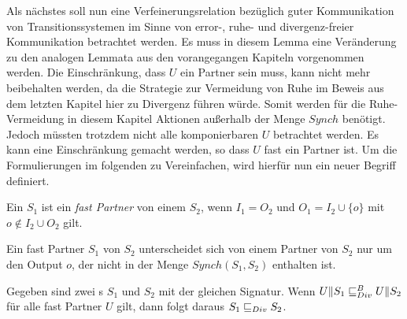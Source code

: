 
Als nächstes soll nun eine Verfeinerungsrelation bezüglich guter Kommunikation
von Transitionssystemen im Sinne von error-, ruhe- und divergenz-freier
Kommunikation betrachtet werden. Es muss in diesem Lemma eine Veränderung zu
den analogen Lemmata aus den vorangegangen Kapiteln vorgenommen werden. Die
Einschränkung, dass $U$ ein Partner sein muss, kann nicht mehr beibehalten
werden, da die Strategie zur Vermeidung von Ruhe im Beweis aus dem letzten
Kapitel hier zu Divergenz führen würde. Somit werden für die Ruhe-Vermeidung in
diesem Kapitel Aktionen außerhalb der Menge $Synch$
benötigt. Jedoch müssten trotzdem nicht alle komponierbaren $U$ betrachtet
werden. Es kann eine Einschränkung gemacht werden, so dass $U$ fast ein
Partner ist. Um die Formulierungen im folgenden zu Vereinfachen, wird hierfür
nun ein neuer Begriff definiert.

\begin{Def}
  Ein \EIO{} $S_1$ ist ein \emph{fast Partner} von einem \EIO{} $S_2$, wenn
  $I_1=O_2$ und $O_1=I_2\cup\{o\}$ mit $o\notin I_2\cup O_2$ gilt.
\end{Def}

Ein fast Partner $S_1$ von $S_2$ unterscheidet sich von einem Partner von $S_2$
nur um den Output $o$, der nicht in der Menge $Synch(S_1,S_2)$ enthalten ist.

\begin{lem}
\label{lemDivVerfeinerung}
  Gegeben sind zwei \EIO{}s $S_1$ und $S_2$ mit der gleichen Signatur. Wenn
  $U\|S_1\sqsubseteq _{Div}^B{} U\|S_2$ für alle fast Partner $U$ gilt, dann folgt daraus
  $S_1\sqsubseteq _{Div}{} S_2$.
\end{lem}


